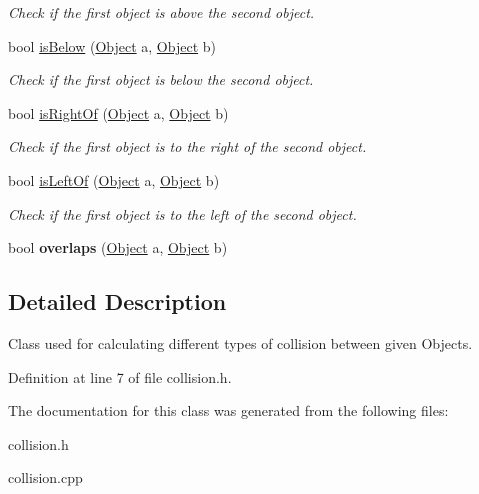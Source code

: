 \begin{DoxyCompactItemize}
\begin{DoxyCompactList}\small\item\em Check if the first object is above the second object. \end{DoxyCompactList}\item 
bool \hyperlink{classCollision_ad5414ecc098c7d63155aea827c7d68b1}{is\+Below} (\hyperlink{classObject}{Object} a, \hyperlink{classObject}{Object} b)\hypertarget{classCollision_ad5414ecc098c7d63155aea827c7d68b1}{}\label{classCollision_ad5414ecc098c7d63155aea827c7d68b1}

\begin{DoxyCompactList}\small\item\em Check if the first object is below the second object. \end{DoxyCompactList}\item 
bool \hyperlink{classCollision_a9330290516beca87905e81a974ffca83}{is\+Right\+Of} (\hyperlink{classObject}{Object} a, \hyperlink{classObject}{Object} b)\hypertarget{classCollision_a9330290516beca87905e81a974ffca83}{}\label{classCollision_a9330290516beca87905e81a974ffca83}

\begin{DoxyCompactList}\small\item\em Check if the first object is to the right of the second object. \end{DoxyCompactList}\item 
bool \hyperlink{classCollision_aea67f8b0cd9b37408e2f6f65006b27d3}{is\+Left\+Of} (\hyperlink{classObject}{Object} a, \hyperlink{classObject}{Object} b)\hypertarget{classCollision_aea67f8b0cd9b37408e2f6f65006b27d3}{}\label{classCollision_aea67f8b0cd9b37408e2f6f65006b27d3}

\begin{DoxyCompactList}\small\item\em Check if the first object is to the left of the second object. \end{DoxyCompactList}\item 
bool {\bfseries overlaps} (\hyperlink{classObject}{Object} a, \hyperlink{classObject}{Object} b)\hypertarget{classCollision_a69886d8a162afecf0332b590a17a183b}{}\label{classCollision_a69886d8a162afecf0332b590a17a183b}

\end{DoxyCompactItemize}


\subsection{Detailed Description}
Class used for calculating different types of collision between given Objects. 

Definition at line 7 of file collision.\+h.



The documentation for this class was generated from the following files\+:\begin{DoxyCompactItemize}
\item 
collision.\+h\item 
collision.\+cpp\end{DoxyCompactItemize}
